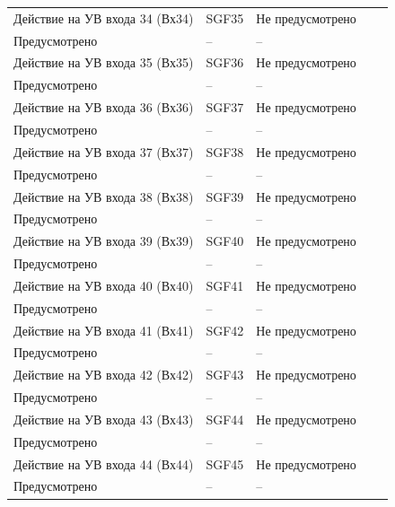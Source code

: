 \begin{longtable}{|>{\centering\arraybackslash}m{5.3cm}|>{\centering\arraybackslash}m{3.3cm}|>{\centering\arraybackslash}m{4.2cm}|>{\centering\arraybackslash}m{1.8cm}|>{\centering\arraybackslash}m{1cm}|}
\hline
\centering Действие на УВ входа 34 (Вх34)  & \centering SGF35 & \centering Не предусмотрено \\ Предусмотрено & \centering -- & \centering \arraybackslash -- \\
\hline
\centering Действие на УВ входа 35 (Вх35)  & \centering SGF36 & \centering Не предусмотрено \\ Предусмотрено & \centering -- & \centering \arraybackslash -- \\
\hline
\centering Действие на УВ входа 36 (Вх36)  & \centering SGF37 & \centering Не предусмотрено \\ Предусмотрено & \centering -- & \centering \arraybackslash -- \\
\hline
\centering Действие на УВ входа 37 (Вх37)  & \centering SGF38 & \centering Не предусмотрено \\ Предусмотрено & \centering -- & \centering \arraybackslash -- \\
\hline
\centering Действие на УВ входа 38 (Вх38)  & \centering SGF39 & \centering Не предусмотрено \\ Предусмотрено & \centering -- & \centering \arraybackslash -- \\
\hline
\centering Действие на УВ входа 39 (Вх39)  & \centering SGF40 & \centering Не предусмотрено \\ Предусмотрено & \centering -- & \centering \arraybackslash -- \\
\hline
\centering Действие на УВ входа 40 (Вх40)  & \centering SGF41 & \centering Не предусмотрено \\ Предусмотрено & \centering -- & \centering \arraybackslash -- \\
\hline
\centering Действие на УВ входа 41 (Вх41)  & \centering SGF42 & \centering Не предусмотрено \\ Предусмотрено & \centering -- & \centering \arraybackslash -- \\
\hline
\centering Действие на УВ входа 42 (Вх42)  & \centering SGF43 & \centering Не предусмотрено \\ Предусмотрено & \centering -- & \centering \arraybackslash -- \\
\hline
\centering Действие на УВ входа 43 (Вх43)  & \centering SGF44 & \centering Не предусмотрено \\ Предусмотрено & \centering -- & \centering \arraybackslash -- \\
\hline
\centering Действие на УВ входа 44 (Вх44)  & \centering SGF45 & \centering Не предусмотрено \\ Предусмотрено & \centering -- & \centering \arraybackslash -- \\

\end{longtable}
